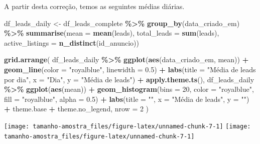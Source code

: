 \documentclass[
]{article}
\newenvironment{Shaded}{\begin{snugshade}}{\end{snugshade}}
\newcommand{\AttributeTok}[1]{\textcolor[rgb]{0.13,0.29,0.53}{#1}}
\newcommand{\DecValTok}[1]{\textcolor[rgb]{0.00,0.00,0.81}{#1}}
\newcommand{\FloatTok}[1]{\textcolor[rgb]{0.00,0.00,0.81}{#1}}
\newcommand{\FunctionTok}[1]{\textcolor[rgb]{0.13,0.29,0.53}{\textbf{#1}}}
\newcommand{\NormalTok}[1]{#1}
\newcommand{\OtherTok}[1]{\textcolor[rgb]{0.56,0.35,0.01}{#1}}
\newcommand{\SpecialCharTok}[1]{\textcolor[rgb]{0.81,0.36,0.00}{\textbf{#1}}}
\newcommand{\StringTok}[1]{\textcolor[rgb]{0.31,0.60,0.02}{#1}}
\begin{document}
A partir desta correção, temos as seguintes médias diárias.

\begin{Shaded}
\begin{Highlighting}[]
\NormalTok{df\_leads\_daily }\OtherTok{\textless{}{-}}\NormalTok{ df\_leads\_complete }\SpecialCharTok{\%\textgreater{}\%}
  \FunctionTok{group\_by}\NormalTok{(data\_criado\_em) }\SpecialCharTok{\%\textgreater{}\%}
  \FunctionTok{summarise}\NormalTok{(}\AttributeTok{mean =} \FunctionTok{mean}\NormalTok{(leads),}
            \AttributeTok{total\_leads =} \FunctionTok{sum}\NormalTok{(leads),}
            \AttributeTok{active\_listings =} \FunctionTok{n\_distinct}\NormalTok{(id\_anuncio))}

\FunctionTok{grid.arrange}\NormalTok{(}
\NormalTok{  df\_leads\_daily }\SpecialCharTok{\%\textgreater{}\%}
    \FunctionTok{ggplot}\NormalTok{(}\FunctionTok{aes}\NormalTok{(data\_criado\_em, mean)) }\SpecialCharTok{+}
    \FunctionTok{geom\_line}\NormalTok{(}\AttributeTok{color =} \StringTok{"royalblue"}\NormalTok{, }\AttributeTok{linewidth =} \FloatTok{0.5}\NormalTok{) }\SpecialCharTok{+}
    \FunctionTok{labs}\NormalTok{(}\AttributeTok{title =} \StringTok{"Média de leads por dia"}\NormalTok{,}
         \AttributeTok{x =} \StringTok{"Dia"}\NormalTok{,}
         \AttributeTok{y =} \StringTok{"Média de leads"}\NormalTok{) }\SpecialCharTok{+}
    \FunctionTok{apply.theme.ts}\NormalTok{(),}
\NormalTok{  df\_leads\_daily }\SpecialCharTok{\%\textgreater{}\%}
    \FunctionTok{ggplot}\NormalTok{(}\FunctionTok{aes}\NormalTok{(mean)) }\SpecialCharTok{+}
    \FunctionTok{geom\_histogram}\NormalTok{(}\AttributeTok{bins =} \DecValTok{20}\NormalTok{, }\AttributeTok{color =} \StringTok{"royalblue"}\NormalTok{, }\AttributeTok{fill =} \StringTok{"royalblue"}\NormalTok{, }\AttributeTok{alpha =} \FloatTok{0.5}\NormalTok{) }\SpecialCharTok{+}
    \FunctionTok{labs}\NormalTok{(}\AttributeTok{title =} \StringTok{""}\NormalTok{,}
         \AttributeTok{x =} \StringTok{"Média de leads"}\NormalTok{,}
         \AttributeTok{y =} \StringTok{""}\NormalTok{) }\SpecialCharTok{+}
\NormalTok{    theme.base }\SpecialCharTok{+}\NormalTok{ theme.no\_legend,}
  \AttributeTok{nrow =} \DecValTok{2}
\NormalTok{)}
\end{Highlighting}
\end{Shaded}

\begin{center}  { \texttt{[image: tamanho-amostra\_files/figure-latex/unnamed-chunk-7-1]} } { \texttt{[image: tamanho-amostra\_files/figure-latex/unnamed-chunk-7-1]} }  \end{center}
\end{document}
